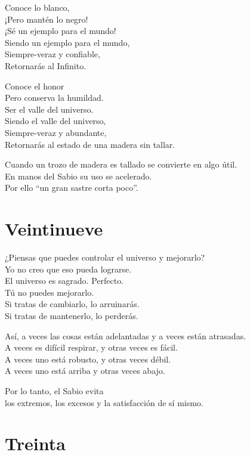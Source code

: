 \documentclass[book,b5paper,hidelinks,final]{memoir}
\begin{document}
	Conoce lo blanco,\\
	¡Pero mantén lo negro!\\
	¡Sé un ejemplo para el mundo!\\
	Siendo un ejemplo para el mundo,\\
	Siempre-veraz y confiable,\\
	Retornarás al Infinito.
	
	Conoce el honor\\
	Pero conserva la humildad.\\
	Ser el valle del universo.\\
	Siendo el valle del universo,\\
	Siempre-veraz y abundante,\\
	Retornarás al estado de una madera sin tallar.
	
	Cuando un trozo de madera es tallado se convierte en algo útil.\\
	En manos del Sabio su uso se acelerado.\\
	Por ello ``un gran sastre corta poco''.
	
	\chapter*{Veintinueve}
	
	¿Piensas que puedes controlar el universo y mejorarlo?\\
	Yo no creo que eso pueda lograrse.\\
	El universo es sagrado. Perfecto.\\
	Tú no puedes mejorarlo.\\
	Si tratas de cambiarlo, lo arruinarás.\\
	Si tratas de mantenerlo, lo perderás.
	
	Así, a veces las cosas están adelantadas y a veces están atrasadas.\\
	A veces es difícil respirar, y otras veces es fácil.\\
	A veces uno está robusto, y otras veces débil.\\
	A veces uno está arriba y otras veces abajo.
	
	Por lo tanto, el Sabio evita\\
	los extremos, los excesos y la satisfacción de sí mismo.
	
	\chapter*{Treinta}
	
\end{document}
